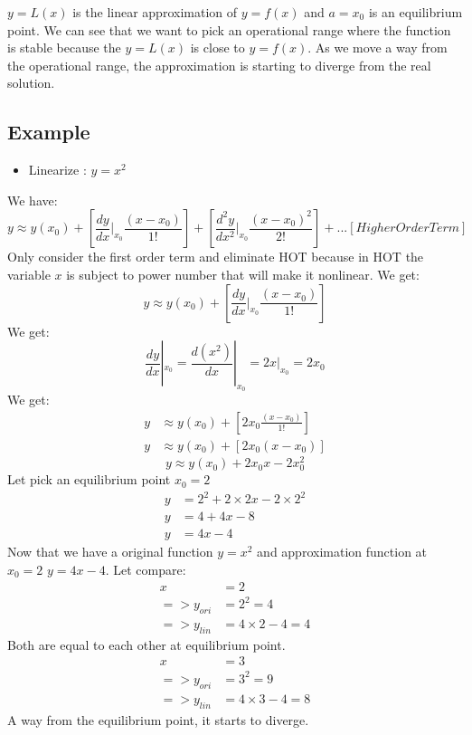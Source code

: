 \documentclass[12pt,a4paper]{article}
\begin{document}
	\(y=L(x)\) is the linear approximation of \(y=f(x)\) and \(a = x_0\) is an equilibrium point. We can see that we want to pick an operational range where the function is stable because the \(y=L(x)\) is close to \(y=f(x)\). As we move a way from the operational range, the approximation is starting to diverge from the real solution.
	
	
	\subsection{Example}
	\begin{itemize}
		\item Linearize : \(y = x^2\)
	\end{itemize}
	We have:
	\[
	y \approx y(x_0) + \left[\frac{dy}{dx}|_{x_0}\frac{(x-x_0)}{1!}\right] + \left[\frac{d^2y}{dx^2}|_{x_0}\frac{(x-x_0)^2}{2!}\right] + ... [Higher Order Term]
	\]
	Only consider the first order term and eliminate HOT because in HOT the variable \(x\) is subject to power number that will make it nonlinear. We get:
	\[
	y \approx y(x_0) + \left[\frac{dy}{dx}|_{x_0}\frac{(x-x_0)}{1!}\right]
	\]
	We get:
	\[
	\frac{dy}{dx}|_{x_0} = \frac{d(x^2)}{dx}|_{x_0} = 2x|_{x_0} = 2x_0
	\]
	We get:
	\[
	\begin{split}
		y &\approx y(x_0) + \left[2x_0\frac{(x-x_0)}{1!}\right]\\
		y &\approx y(x_0) + \left[2x_0(x-x_0)\right]
	\end{split}
	\]
	\[
	\boxed{y \approx y(x_0) + 2x_0x-2x_0^2}
	\]
	Let pick an equilibrium point \(x_0=2\)
	\[
	\begin{split}
		y &= 2^2 + 2\times2x-2\times2^2 \\
		y &= 4+4x-8 \\
		y &= 4x-4
	\end{split}
	\]
	Now that we have a original function \(y=x^2\) and approximation function at \(x_0 = 2\) \(y=4x-4\). Let compare:
	\[
	\begin{split}
		x &= 2 \\
		=>y_{ori} &= 2^2 = 4 \\
		=>y_{lin} &= 4\times2 - 4 = 4
	\end{split}
	\]
	Both are equal to each other at equilibrium point.
	\[
	\begin{split}
		x &= 3 \\
		=>y_{ori} &= 3^2 = 9 \\
		=>y_{lin} &= 4\times3 - 4 = 8
	\end{split}
	\]
	A way from the equilibrium point, it starts to diverge.
	
	
\end{document}
